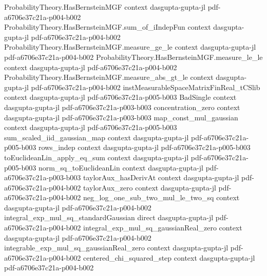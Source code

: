 \begin{theorem}
\label{johnson_lindenstrauss_dim_bound}
\leanok
{}
\proofstep
  {ProbabilityTheory.HasBernsteinMGF}
  {context}
  {dasgupta-gupta-jl}
  {pdf-a6706e37c21a-p004-b002}
\proofstep
  {ProbabilityTheory.HasBernsteinMGF.sum_of_iIndepFun}
  {context}
  {dasgupta-gupta-jl}
  {pdf-a6706e37c21a-p004-b002}
\proofstep
  {ProbabilityTheory.HasBernsteinMGF.measure_ge_le}
  {context}
  {dasgupta-gupta-jl}
  {pdf-a6706e37c21a-p004-b002}
\proofstep
  {ProbabilityTheory.HasBernsteinMGF.measure_le_le}
  {context}
  {dasgupta-gupta-jl}
  {pdf-a6706e37c21a-p004-b002}
\proofstep
  {ProbabilityTheory.HasBernsteinMGF.measure_abs_gt_le}
  {context}
  {dasgupta-gupta-jl}
  {pdf-a6706e37c21a-p004-b002}
\proofstep
  {instMeasurableSpaceMatrixFinReal_tCSlib}
  {context}
  {dasgupta-gupta-jl}
  {pdf-a6706e37c21a-p005-b003}
\proofstep
  {BadSingle}
  {context}
  {dasgupta-gupta-jl}
  {pdf-a6706e37c21a-p003-b003}
\proofstep
  {concentration_zero}
  {context}
  {dasgupta-gupta-jl}
  {pdf-a6706e37c21a-p003-b003}
\proofstep
  {map_const_mul_gaussian}
  {context}
  {dasgupta-gupta-jl}
  {pdf-a6706e37c21a-p005-b003}
\proofstep
  {sum_scaled_iid_gaussian_map}
  {context}
  {dasgupta-gupta-jl}
  {pdf-a6706e37c21a-p005-b003}
\proofstep
  {rows_indep}
  {context}
  {dasgupta-gupta-jl}
  {pdf-a6706e37c21a-p005-b003}
\proofstep
  {toEuclideanLin_apply_eq_sum}
  {context}
  {dasgupta-gupta-jl}
  {pdf-a6706e37c21a-p005-b003}
\proofstep
  {norm_sq_toEuclideanLin}
  {context}
  {dasgupta-gupta-jl}
  {pdf-a6706e37c21a-p003-b003}
\proofstep
  {taylorAux_hasDerivAt}
  {context}
  {dasgupta-gupta-jl}
  {pdf-a6706e37c21a-p004-b002}
\proofstep
  {taylorAux_zero}
  {context}
  {dasgupta-gupta-jl}
  {pdf-a6706e37c21a-p004-b002}
\proofstep
  {neg_log_one_sub_two_mul_le_two_sq}
  {context}
  {dasgupta-gupta-jl}
  {pdf-a6706e37c21a-p004-b002}
\proofstep
  {integral_exp_mul_sq_standardGaussian}
  {direct}
  {dasgupta-gupta-jl}
  {pdf-a6706e37c21a-p004-b002}
\proofstep
  {integral_exp_mul_sq_gaussianReal_zero}
  {context}
  {dasgupta-gupta-jl}
  {pdf-a6706e37c21a-p004-b002}
\proofstep
  {integrable_exp_mul_sq_gaussianReal_zero}
  {context}
  {dasgupta-gupta-jl}
  {pdf-a6706e37c21a-p004-b002}
\proofstep
  {centered_chi_squared_step}
  {context}
  {dasgupta-gupta-jl}
  {pdf-a6706e37c21a-p004-b002}

\end{theorem}
